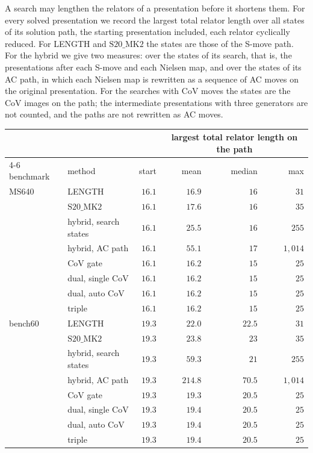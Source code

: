 \documentclass[11pt]{article}
\theoremstyle{definition}
\theoremstyle{remark}
\newcommand{\SMK}{\mathrm{S20\_MK2}}
\begin{document}
A search may lengthen the relators of a presentation before it shortens them. For every solved presentation we
record the largest total relator length over all states of its solution path, the starting presentation included,
each relator cyclically reduced. For LENGTH and $\SMK$ the states are those of the S-move path. For the hybrid we give
two measures: over the states of its search, that is, the presentations after each S-move and each Nielsen map, and
over the states of its AC path, in which each Nielsen map is rewritten as a sequence of AC moves on the original
presentation. For the searches with CoV moves the states are the CoV images on the path; the intermediate
presentations with three generators are not counted, and the paths are not rewritten as AC moves.

\begin{table}[ht]
\centering
\small
\begin{tabular}{llrrrr}
\toprule
& & & \multicolumn{3}{c}{largest total relator length on the path}\\
\cmidrule(lr){4-6}
benchmark & method & start & mean & median & max\\
\midrule
MS640 & LENGTH & $16.1$ & $16.9$ & $16$ & $31$\\
 & $\SMK$ & $16.1$ & $17.6$ & $16$ & $35$\\
 & hybrid, search states & $16.1$ & $25.5$ & $16$ & $255$\\
 & hybrid, AC path & $16.1$ & $55.1$ & $17$ & $1{,}014$\\
 & CoV gate & $16.1$ & $16.2$ & $15$ & $25$\\
 & dual, single CoV & $16.1$ & $16.2$ & $15$ & $25$\\
 & dual, auto CoV & $16.1$ & $16.2$ & $15$ & $25$\\
 & triple & $16.1$ & $16.2$ & $15$ & $25$\\
\midrule
bench60 & LENGTH & $19.3$ & $22.0$ & $22.5$ & $31$\\
 & $\SMK$ & $19.3$ & $23.8$ & $23$ & $35$\\
 & hybrid, search states & $19.3$ & $59.3$ & $21$ & $255$\\
 & hybrid, AC path & $19.3$ & $214.8$ & $70.5$ & $1{,}014$\\
 & CoV gate & $19.3$ & $19.3$ & $20.5$ & $25$\\
 & dual, single CoV & $19.3$ & $19.4$ & $20.5$ & $25$\\
 & dual, auto CoV & $19.3$ & $19.4$ & $20.5$ & $25$\\
 & triple & $19.3$ & $19.4$ & $20.5$ & $25$\\

\end{tabular}
\end{table}
\end{document}
